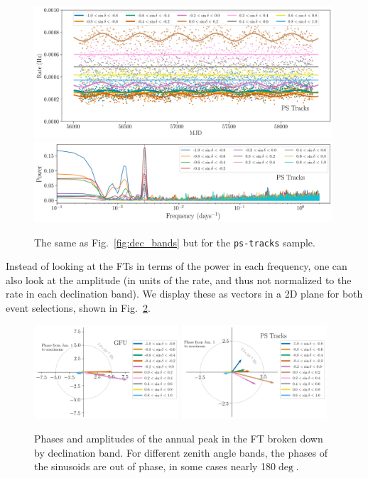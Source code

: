 \begin{figure}
    \centering
    \includegraphics[width=0.99\textwidth]{figures/seasonal/ps_tracks_dec_band_with_model.png}
    \includegraphics[width=0.99\textwidth]{figures/seasonal/ps_tracks_dec_bands_FFT.png}
    \caption[\texttt{ps-tracks} seasonal variations]{The same as Fig.~\ref{fig:dec_bands} but for the \texttt{ps-tracks} sample.}
    \label{fig:dec_bands_ps_tracks}
\end{figure}

Instead of looking at the FTs in terms of the power in each frequency, one can also look at the amplitude (in units of the rate, and thus not normalized to the rate in each declination band). We display these as vectors in a 2D plane for both event selections, shown in Fig.~\ref{fig:phasor}. 

\begin{figure}
    \centering
    \includegraphics[width=0.48\textwidth]{figures/seasonal/gfu_online_phasor.png}
    \includegraphics[width=0.48\textwidth]{figures/seasonal/ps_tracks_phasor.png}
    \caption[Seasonal variation phasors]{Phases and amplitudes of the annual peak in the FT broken down by declination band. For different zenith angle bands, the phases of the sinusoids are out of phase, in some cases nearly 180$\deg$. }
    \label{fig:phasor}
\end{figure}

